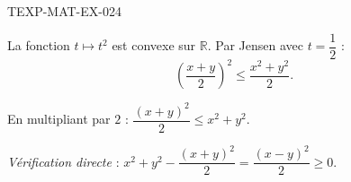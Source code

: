 \begin{corrige}{TEXP-MAT-EX-024}

La fonction $t \mapsto t^2$ est convexe sur $\mathbb{R}$. Par Jensen avec $t = \dfrac{1}{2}$ :
\[ \left(\frac{x+y}{2}\right)^2 \leq \frac{x^2 + y^2}{2}. \]


En multipliant par $2$ : $\dfrac{(x+y)^2}{2} \leq x^2 + y^2$.

\emph{Vérification directe} : $x^2 + y^2 - \dfrac{(x+y)^2}{2} = \dfrac{(x-y)^2}{2} \geq 0$.

\end{corrige}
